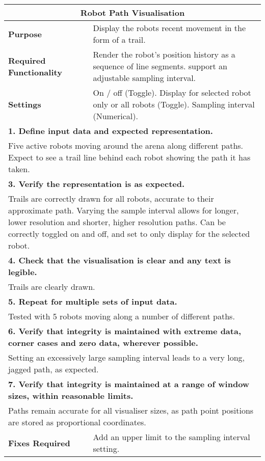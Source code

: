 \begin{longtable}{ l p{10cm} }
 \hline
 \multicolumn{2}{c}{\textbf{Robot Path Visualisation}}\\
 \hline
 \textbf{Purpose} & Display the robots recent movement in the form of a trail.\\
 \textbf{Required Functionality} & Render the robot's position history as a sequence of line segments. support an adjustable sampling interval.\\
 \textbf{Settings} & On / off (Toggle). Display for selected robot only or all robots (Toggle). Sampling interval (Numerical).\\
 \hline
 \multicolumn{2}{p{14cm}}{\textbf{1. Define input data and expected representation.}}\\
 \multicolumn{2}{p{14cm}}{Five active robots moving around the arena along different paths. Expect to see a trail line behind each robot showing the path it has taken.}\\
 \hline
 \multicolumn{2}{p{14cm}}{\textbf{3. Verify the representation is as expected.}}\\
 \multicolumn{2}{p{14cm}}{Trails are correctly drawn for all robots, accurate to their approximate path. Varying the sample interval allows for longer, lower resolution and shorter, higher resolution paths. Can be correctly toggled on and off, and set to only display for the selected robot.}\\
 \hline
 \multicolumn{2}{p{14cm}}{\textbf{4. Check that the visualisation is clear and any text is legible.}}\\
 \multicolumn{2}{p{14cm}}{Trails are clearly drawn.}\\
 \hline
 \multicolumn{2}{p{14cm}}{\textbf{5. Repeat for multiple sets of input data.}}\\
 \multicolumn{2}{p{14cm}}{Tested with 5 robots moving along a number of different paths.}\\
 \hline
 \multicolumn{2}{p{14cm}}{\textbf{6. Verify that integrity is maintained with extreme data, corner cases and zero data, wherever possible.}}\\
 \multicolumn{2}{p{14cm}}{Setting an excessively large sampling interval leads to a very long, jagged path, as expected.}\\
 \hline
 \multicolumn{2}{p{14cm}}{\textbf{7. Verify that integrity is maintained at a range of window sizes, within reasonable limits.}}\\
 \multicolumn{2}{p{14cm}}{Paths remain accurate for all visualiser sizes, as path point positions are stored as proportional coordinates.}\\
 \hline
 \textbf{Fixes Required} & Add an upper limit to the sampling interval setting.\\
 \bottomrule
\end{longtable}
\clearpage




